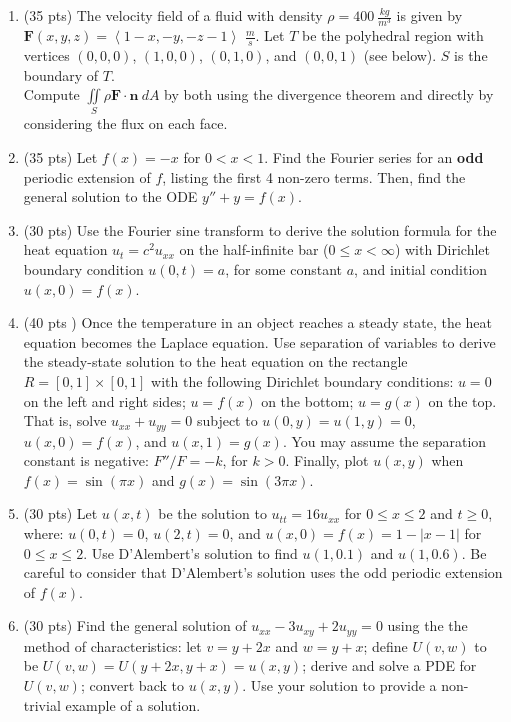 \documentclass[10pt]{article}
\begin{document}
\begin{enumerate}

\item (35 pts) The velocity field of a fluid with density $\rho = 400\ \tfrac{kg}{m^3}$ is given by $\textbf{F}(x,y,z) = \left<1-x,-y,-z-1\right>$ $\tfrac{m}{s}$. Let $T$ be the polyhedral region with vertices $(0,0,0)$, $(1,0,0)$, $(0,1,0)$, and $(0,0,1)$ (see below).  $S$ is the boundary of $T$. \\ Compute $\displaystyle\iint\limits_{S} \rho\textbf{F}\cdot\textbf{n}\ dA$ by both using the divergence theorem and directly by considering the flux on each face.\\

\item (35 pts) Let $f(x) = -x$ for $0<x<1$.  Find the Fourier series for an \textbf{odd} periodic extension of $f$, listing the first 4 non-zero terms.  Then, find the general solution to the ODE $y''+y=f(x)$.\\

\item (30 pts)  Use the Fourier sine transform to derive the solution formula for the heat equation $u_{t}=c^2u_{xx}$ on the half-infinite bar ($0\le x <\infty$) with Dirichlet boundary condition $u(0,t)=a$, for some constant $a$, and initial condition $u(x,0)=f(x)$.\\

\item (40 pts ) Once the temperature in an object reaches a steady state, the heat equation becomes the Laplace equation.  Use separation of variables to derive the steady-state solution to the heat equation on the rectangle $R = [0,1]\times[0,1]$ with the following Dirichlet boundary conditions: $u=0$ on the left and right sides; $u=f(x)$ on the bottom; $u=g(x)$ on the top.  That is, solve $u_{xx}+u_{yy}=0$ subject to $u(0,y) = u(1,y)=0$, $u(x,0) =f(x)$, and $u(x,1)=g(x)$.  You may assume the separation constant is negative: $F''/F = -k$, for $k>0$.  Finally, plot $u(x,y)$ when $f(x) = \sin{(\pi x)}$ and $g(x) = \sin{(3\pi x)}$.\\

\item (30 pts) Let $u(x,t)$ be the solution to $u_{tt}=16u_{xx}$ for $0\leq x\leq 2$ and $t\geq 0$, where: $u(0,t)=0$, $u(2,t)=0$, and $u(x,0) = f(x)=1-|x-1|$ for $0\le x\le 2$. Use D'Alembert's solution to find $u(1,0.1)$ and $u(1,0.6)$.  Be careful to consider that D'Alembert's solution uses the odd periodic extension of $f(x)$. \\

\item (30 pts)  Find the general solution of $u_{xx}-3u_{xy}+2u_{yy}=0$ using the  the method of characteristics: let $v=y+2x$ and $w=y+x$; define $U(v,w)$ to be $U(v,w) = U(y+2x,y+x)=u(x,y)$; derive and solve a PDE for $U(v,w)$; convert back to $u(x,y)$. Use your solution to provide a non-trivial example of a solution.  


\end{enumerate}
\end{document}
